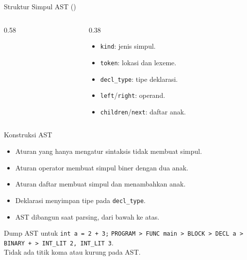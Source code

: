\documentclass[aspectratio=169,10pt,t]{beamer}
\begin{document}
\begin{frame}[fragile]{Struktur Simpul AST ()}
  \begin{columns}[T,onlytextwidth]
    \begin{column}{0.58\textwidth}
      
    \end{column}
    \begin{column}{0.38\textwidth}
      \begin{itemize}
        \item \texttt{kind}: jenis simpul.
        \item \texttt{token}: lokasi dan lexeme.
        \item \texttt{decl\_type}: tipe deklarasi.
        \item \texttt{left}/\texttt{right}: operand.
        \item \texttt{children}/\texttt{next}: daftar anak.
      \end{itemize}
    \end{column}
  \end{columns}
\end{frame}

\begin{frame}{Konstruksi AST}
  \begin{itemize}
    \item Aturan yang hanya mengatur sintaksis tidak membuat simpul.
    \item Aturan operator membuat simpul biner dengan dua anak.
    \item Aturan daftar membuat simpul dan menambahkan anak.
    \item Deklarasi menyimpan tipe pada \texttt{decl\_type}.
    \item AST dibangun saat parsing, dari bawah ke atas.
  \end{itemize}

  \vspace{4pt}
  \begin{exampleblock}{Dump AST untuk \texttt{int a = 2 + 3;}}
    \footnotesize
    \texttt{PROGRAM > FUNC main > BLOCK > DECL a > BINARY + >
    INT\_LIT 2, INT\_LIT 3}.\\
    Tidak ada titik koma atau kurung pada AST.
  \end{exampleblock}
\end{frame}
\end{document}
